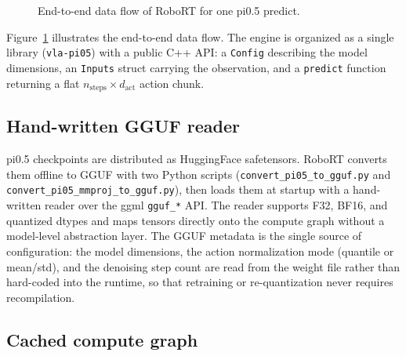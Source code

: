 \documentclass[11pt]{article}
\begin{document}
\begin{figure}[t]
  \centering
  \caption{End-to-end data flow of RoboRT for one pi0.5 predict.}
  \label{fig:pipeline}
\end{figure}

Figure~\ref{fig:pipeline} illustrates the end-to-end data flow. The engine
is organized as a single library (\texttt{vla-pi05}) with a public C++ API:
a \texttt{Config} describing the model dimensions, an \texttt{Inputs} struct
carrying the observation, and a \texttt{predict} function returning a flat
$n_{\text{steps}} \times d_{\text{act}}$ action chunk.

\subsection{Hand-written GGUF reader}
\label{sec:method-reader}

pi0.5 checkpoints are distributed as HuggingFace safetensors. RoboRT
converts them offline to GGUF with two Python scripts
(\texttt{convert\_pi05\_to\_gguf.py} and
\texttt{convert\_pi05\_mmproj\_to\_gguf.py}), then loads them at startup with
a hand-written reader over the ggml \texttt{gguf\_*} API. The reader
supports F32, BF16, and quantized dtypes and maps tensors directly onto the
compute graph without a model-level abstraction layer. The GGUF metadata is
the single source of configuration: the model dimensions, the action
normalization mode (quantile or mean/std), and the denoising step count are
read from the weight file rather than hard-coded into the runtime, so that
retraining or re-quantization never requires recompilation.

\subsection{Cached compute graph}
\label{sec:method-graph}
\end{document}
